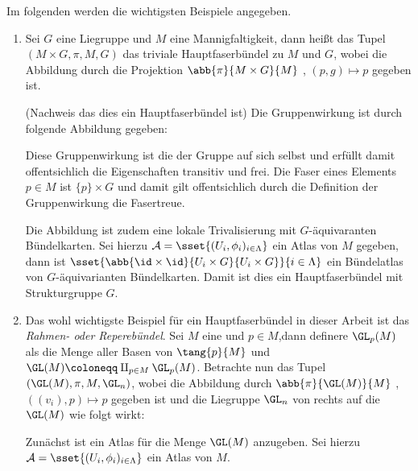 Im folgenden werden die wichtigsten Beispiele angegeben.

\begin{Bsp}
  \begin{enumerate}[1)]
  \item Sei $G$ eine Liegruppe und $M$ eine Mannigfaltigkeit, dann
    heißt das Tupel $(M \times G, \pi, M, G)$ das triviale
    Hauptfaserbündel zu $M$ und $G$, wobei die Abbildung durch die
    Projektion $\abb{\pi}{M \times G}{M}$ , $(p,g) \mapsto p$ gegeben
    ist.
    \begin{smallproof}(Nachweis das dies ein Hauptfaserbündel ist) Die
      Gruppenwirkung ist durch folgende Abbildung gegeben:
		
      Diese Gruppenwirkung ist die der Gruppe auf sich selbst und
      erfüllt damit offentsichlich die Eigenschaften transitiv und
      frei. Die Faser eines Elements $p\in M$ ist $\{p\}\times G$ und
      damit gilt offentsichlich durch die Definition der
      Gruppenwirkung die Fasertreue.
		
      Die Abbildung ist zudem eine lokale Trivalisierung mit
      $G$-äquivaranten Bündelkarten. Sei hierzu
      $\mathcal{A}=\sset{(U_i,\phi_i)_{i \in \Lambda}}$ ein Atlas von
      $M$ gegeben, dann ist
      $ \sset{\abb{\id\times\id}{U_i \times G}{U_i\times G}}{i \in
        \Lambda} $
      ein Bündelatlas von $G$-äquivarianten Bündelkarten.  Damit ist
      dies ein Hauptfaserbündel mit Strukturgruppe $G$.
		\end{smallproof}
		
              \item Das wohl wichtigste Beispiel für ein
                Hauptfaserbündel in dieser Arbeit ist das
                \textit{Rahmen- oder Reperebündel}. Sei $M$ eine \mfg
                und $p \in M$,dann definere $\GL_p(M)$ als die Menge
                aller Basen von $\tang{p}{M}$ und
                $\GL(M) \coloneqq \amalg_{p \in M} \GL_p(M)$.
                Betrachte nun das Tupel $(\GL(M),\pi,M,\GL_n)$, wobei
                die Abbildung durch $\abb{\pi}{\GL(M)}{M}$ ,
                $((v_i),p) \mapsto p$ gegeben ist und die Liegruppe
                $\GL_n$ von rechts auf die \mfg $\GL(M)$ wie folgt
                wirkt:
		\begin{center}
		\end{center}
		\begin{smallproof}
                  Zunächst ist ein Atlas für die Menge $ \GL(M) $
                  anzugeben. Sei hierzu
                  $\mathcal{A}=\sset{(U_i,\phi_i)_{i\in \Lambda}}$ ein
                  Atlas von $M$.  
			

\end{smallproof}
\end{enumerate}
\end{Bsp}
